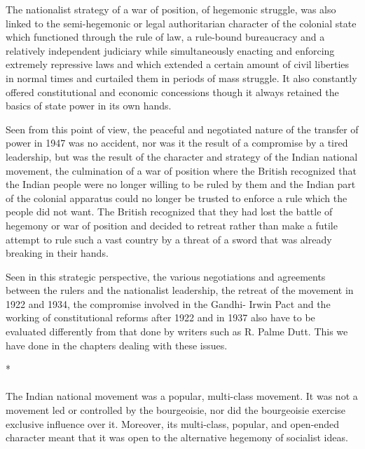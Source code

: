 The nationalist strategy of a war of position, of hegemonic struggle, was also linked to the semi-hegemonic or legal authoritarian character of the colonial state which functioned through the rule of law, a rule-bound bureaucracy and a relatively independent judiciary while simultaneously enacting and enforcing extremely repressive laws and which extended a certain amount of civil liberties in normal times and curtailed them in periods of mass struggle. It also constantly offered constitutional and economic concessions though it always retained the basics of state power in its own hands.

Seen from this point of view, the peaceful and negotiated nature of the transfer of power in 1947 was no accident, nor was it the result of a compromise by a tired leadership, but was the result of the character and strategy of the Indian national movement, the culmination of a war of position where the British recognized that the Indian people were no longer willing to be ruled by them and the Indian part of the colonial apparatus could no longer be trusted to enforce a rule which the people did not want. The British recognized that they had lost the battle of hegemony or war of position and decided to retreat rather than make a futile attempt to rule such a vast country by a threat of a sword that was already breaking in their hands.

Seen in this strategic perspective, the various negotiations and agreements between the rulers and the nationalist leadership, the retreat of the movement in 1922 and 1934, the compromise involved in the Gandhi- Irwin Pact and the working of constitutional reforms after 1922 and in 1937 also have to be evaluated differently from that done by writers such as R. Palme Dutt. This we have done in the chapters dealing with these issues.

\begin{center}*\end{center}

\paragraph*{}
The Indian national movement was a popular, multi-class movement. It was not a movement led or controlled by the bourgeoisie, nor did the bourgeoisie exercise exclusive influence over it. Moreover, its multi-class, popular, and open-ended character meant that it was open to the alternative hegemony of socialist ideas.

